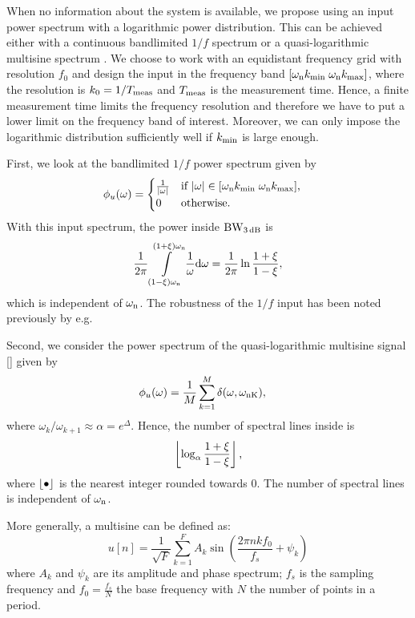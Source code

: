 When no information about the system is available, we propose using an input power spectrum with a logarithmic power distribution. This can be achieved either with a continuous bandlimited $1/f$ spectrum or a quasi-logarithmic multisine spectrum \citep{Pintelon2012}. 
We choose to work with an equidistant frequency grid with resolution $f_0$ and design the input in the frequency band $[\wn \kMin\; \wn \kMax]$, where the resolution is $k_0=1/\Tm$ and $\Tm$ is the measurement time. Hence, a finite measurement time limits the frequency resolution and therefore we have to put a lower limit on the frequency band of interest. Moreover, we can only impose the logarithmic distribution sufficiently well if $\kMin$ is large enough.

First, we look at the bandlimited $1/f$ power spectrum given by
\begin{align*}
\label{eq:excitation:pink}
\phi_u(\omega) &=\begin{cases}\frac{1}{|\omega|} &\text{if $|\omega|\in[\wn \kMin\; \wn \kMax]$,}\\
                        0           &\text{otherwise}.
            \end{cases}
\end{align*}
With this input spectrum, the power inside $\wdB$ is
\begin{align}
  \frac{1}{2\pi}
    \int\limits_{(1-\damping)\wn}^{(1+\damping)\wn}
     \frac{1}{\omega} \dd{\omega}
  = \frac{1}{2\pi}
    \ln{\frac{1+\damping}{1-\damping}},
\end{align}
which is independent of $\wn$. The robustness of the $1/f$ input has been noted previously by e.g. \cite{Rojas2007}

Second, we consider the power spectrum of the quasi-logarithmic multisine signal [\cite{Pintelon2012}] given by
\begin{align}
  \phi_u(\omega) &= \frac{1}{M}\sum_{k=1}^{M}{\delta(\omega,\wn[K])},
\end{align}
where $\omega_{k}/\omega_{k+1} \approx \alpha = e^{\Delta}$.
Hence, the number of spectral lines inside \wdB is 
\begin{align}
  \floor{
    \log_{\alpha} \frac{1+\damping}{1-\damping} 
  }
  \text{,}
\end{align}
where $\floor{\placeholder}$ is the nearest integer rounded towards $0$. The number of spectral lines is independent of $\wn$. 

More generally, a multisine can be defined as:
\begin{equation}
 u \left[ n\right] = \frac{1}{\sqrt{F}}
   \sum_{k=1}^{F} 
     A_k 
     \sin 
       \left(\frac{2\pi n k f_0}{f_s} + \psi_k \right)
  \label{eq:excitation:MS}
\end{equation}
where $A_k$ and $\psi_k$ are its amplitude and phase spectrum; $f_s$ is the
sampling frequency and $f_0 = \frac{f_s}{N}$ the base frequency with $N$ the 
number of points in a period. 

